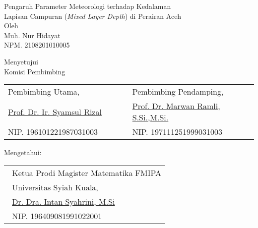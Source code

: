 \setcounter{page}{2}
\vspace{1.5pc}

\begin{center}
	\normalsize
	\noindent
	Pengaruh Parameter Meteorologi terhadap Kedalaman \\
	Lapisan Campuran (\textit{Mixed Layer Depth}) di Perairan Aceh \\
	
	\vspace{2cm}
	Oleh \\
	Muh. Nur Hidayat\\
	NPM. 2108201010005
\end{center}

\begin{center}
	\vspace{4cm}
	Menyetujui\\
	Komisi Pembimbing
	
	\vspace{1cm}
	
	\begin{tabular}{l l }
		Pembimbing Utama,\verb"                 " & Pembimbing Pendamping, \verb"            "\\[2.25cm]
		\underline{Prof. Dr. Ir. Syamsul Rizal} & \underline{Prof. Dr. Marwan Ramli, S.Si.,M.Si.}\\
		NIP. 196101221987031003 & NIP. 197111251999031003
	\end{tabular}
\end{center}

\begin{center}
	\vspace{0.5cm}
	Mengetahui:\\%
	
	\vspace{1cm}
	
	\begin{tabular}{l }
		\verb" "Ketua Prodi Magister Matematika FMIPA\\
		\verb" "Universitas Syiah Kuala,\\[2.25cm]
		\verb" "\underline{Dr. Dra. Intan Syahrini, M.Si}\\
		\verb" "NIP. 196409081991022001
	\end{tabular}
\end{center}
\vspace{0.3cm}
\begin{center}
	
\end{center}
\thispagestyle{empty}
